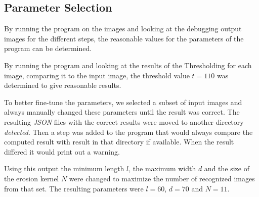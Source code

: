 \subsection{Parameter Selection} \label{parameter}

By running the program on the images and looking at the debugging output images
for the different steps, the reasonable values for the parameters of the program
can be determined.

By running the program and looking at the results of the Thresholding for each
image, comparing it to the input image, the threshold value $t = 110$ was
determined to give reasonable results.

To better fine-tune the parameters, we selected a subset of input images and
always manually changed these parameters until the result was correct. The
resulting \textit{JSON} files with the correct results were moved to another
directory \textit{detected}. Then a step was added to the program that would
always compare the computed result with result in that directory if available.
When the result differed it would print out a warning.

Using this output the minimum length $l$, the maximum width $d$ and the size of
the erosion kernel $N$ were changed to maximize the number of recognized images
from that set. The resulting parameters were $l = 60$, $d = 70$ and $N =11$.
